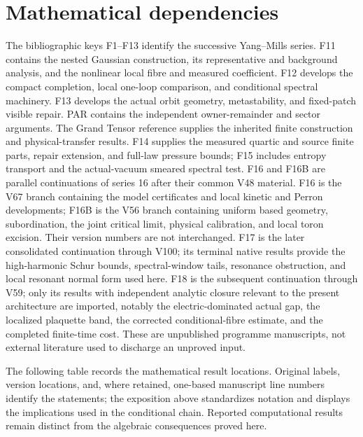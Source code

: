 \documentclass[11pt,oneside,openany]{book}
\theoremstyle{definition}
\theoremstyle{remark}
\begin{document}
\section{Mathematical dependencies}
The bibliographic keys F1--F13 identify the successive Yang--Mills
series. F11 contains the nested Gaussian construction, its representative
and background analysis, and the nonlinear local fibre and measured
coefficient. F12 develops the compact completion, local one-loop
comparison, and conditional spectral machinery. F13 develops the
actual orbit geometry, metastability, and fixed-patch visible repair. PAR contains the independent owner-remainder
and sector arguments. The Grand Tensor reference supplies the inherited
finite construction and physical-transfer results. F14 supplies the
measured quartic and source finite parts, repair extension, and
full-law pressure bounds; F15 includes entropy transport and the
actual-vacuum smeared spectral test. F16 and F16B are parallel
continuations of series 16 after their common V48 material. F16 is
the V67 branch containing the model certificates and local kinetic
and Perron developments; F16B is the V56 branch containing uniform
based geometry, subordination, the joint critical limit, physical
calibration, and local toron excision. Their version numbers are not
interchanged. F17 is the later consolidated continuation through V100;
its terminal native results provide the high-harmonic Schur bounds,
spectral-window tails, resonance obstruction, and local resonant normal
form used here. F18 is the subsequent continuation through V59; only
its results with independent analytic closure relevant to the present
architecture are imported, notably the electric-dominated actual gap,
the localized plaquette band, the corrected conditional-fibre estimate,
and the completed finite-time cost. These are unpublished programme
manuscripts, not external literature used to discharge an unproved
input.

The following table records the mathematical result locations. Original
labels, version locations, and, where retained, one-based manuscript
line numbers identify the statements;
the exposition above standardizes notation and displays the implications
used in the conditional chain. Reported computational results remain
distinct from the algebraic consequences proved here.
\end{document}
